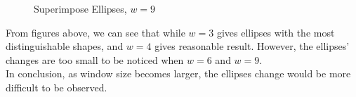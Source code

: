 \documentclass[letterpaper]{article}
\begin{document}
\begin{figure}[H] \centering
{}
\caption{Superimpose Ellipses, $w=9$}
\label{q1_b_w_9}
\end{figure}


From figures above, we can see that while $w = 3$ gives ellipses with the most distinguishable shapes, and $w = 4$ gives reasonable result. However, the ellipses' changes are too small to be noticed when $w = 6$ and $w = 9$.\\

In conclusion, as window size becomes larger, the ellipses change would be more difficult to be observed.\\
\end{document}

